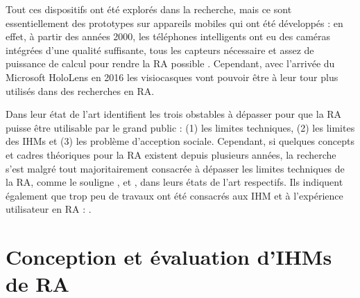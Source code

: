 

Tout ces dispositifs ont été explorés dans la recherche, mais ce sont essentiellement des prototypes sur appareils mobiles qui ont été développés : en effet, à partir des années 2000, les téléphones intelligents ont eu des caméras intégrées d'une qualité suffisante, tous les capteurs nécessaire et assez de puissance de calcul pour rendre la RA possible \citep{Huang2013}. Cependant, avec l'arrivée du Microsoft HoloLens en 2016 les visiocasques vont pouvoir être à leur tour plus utilisés dans des recherches en RA.

Dans leur état de l'art \cite{Azuma2001} identifient les trois obstables à dépasser pour que la RA puisse être utilisable par le grand public : (1) les limites techniques, (2) les limites des IHMs et (3) les problème d'acception sociale. Cependant, si quelques concepts et cadres théoriques pour la RA existent depuis plusieurs années, la recherche s'est malgré tout majoritairement consacrée à dépasser les limites techniques de la RA, comme le souligne \cite{Zhou2008}, \cite{VanKrevelen2010} et \cite{Billinghurst2015}, dans leurs états de l'art respectifs. Ils indiquent également que trop peu de travaux ont été consacrés aux IHM et à l'expérience utilisateur en RA :  \citep{Billinghurst2015}.


\section{Conception et évaluation d'IHMs de RA}
\label{sec:litterature_ar_hci}


